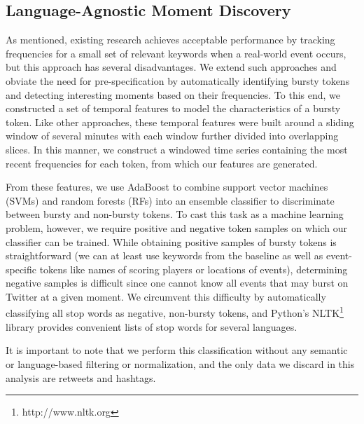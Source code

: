 \documentclass{sig-alternate}
\begin{document}
\subsection{Language-Agnostic Moment Discovery}

As mentioned, existing research achieves acceptable performance by tracking frequencies for a small set of relevant keywords when a real-world event occurs, but this approach has several disadvantages.
We extend such approaches and obviate the need for pre-specification by automatically identifying bursty tokens and detecting interesting moments based on their frequencies.
To this end, we constructed a set of temporal features to model the characteristics of a bursty token.
Like other approaches, these temporal features were built around a sliding window of several minutes with each window further divided into overlapping slices. %
In this manner, we construct a windowed time series containing the most recent frequencies for each token, from which our features are generated.


From these features, we use AdaBoost to combine support vector machines (SVMs) and random forests (RFs) into an ensemble classifier to discriminate between bursty and non-bursty tokens.
To cast this task as a machine learning problem, however, we require positive and negative token samples on which our classifier can be trained.
While obtaining positive samples of bursty tokens is straightforward (we can at least use keywords from the baseline as well as event-specific tokens like names of scoring players or locations of events), determining negative samples is difficult since one cannot know all events that may burst on Twitter at a given moment.
We circumvent this difficulty by automatically classifying all stop words as negative, non-bursty tokens, and Python's NLTK\footnote{http://www.nltk.org} library provides convenient lists of stop words for several languages.

It is important to note that we perform this classification without any semantic or language-based filtering or normalization, and the only data we discard in this analysis are retweets and hashtags.
\end{document}
